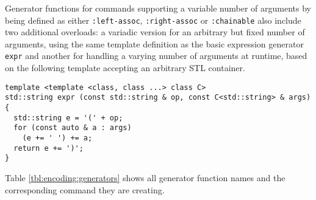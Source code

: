 \noindent
Generator functions for \SMTLIB commands supporting a variable number of arguments by being defined as either \lstinline[language=SMTLib]{:left-assoc}, \lstinline[language=SMTLib]{:right-assoc} or \lstinline[language=SMTLib]{:chainable} %
also include two additional overloads:
a variadic version for an arbitrary but fixed number of arguments, using the same template definition as the basic expression generator \lstinline[style=c++]{expr}
and another for handling a varying number of arguments at runtime, based on the following template accepting an arbitrary STL container.



\newpage

\begin{lstlisting}[style=c++]
template <template <class, class ...> class C>
std::string expr (const std::string & op, const C<std::string> & args)
{
  std::string e = '(' + op;
  for (const auto & a : args)
    (e += ' ') += a;
  return e += ')';
}
\end{lstlisting}

\noindent
Table \ref{tbl:encoding:generators} shows all generator function names and the corresponding \SMTLIB command they are creating.

